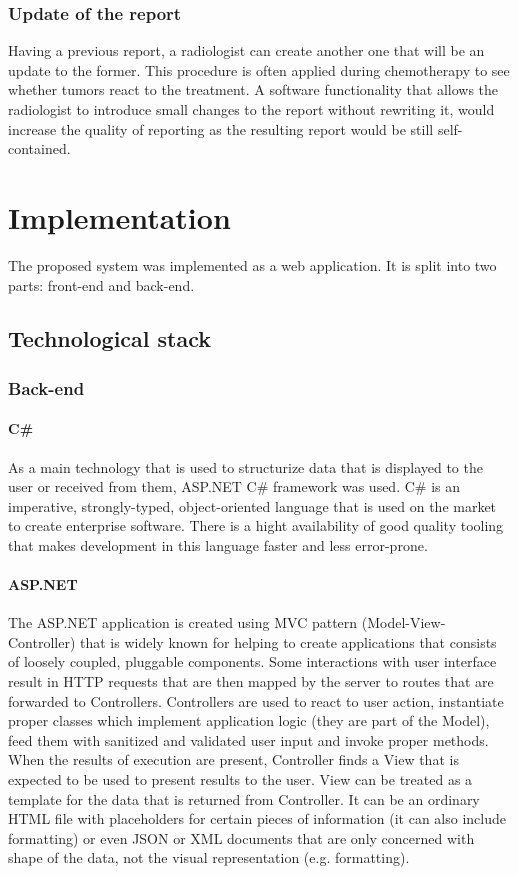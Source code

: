 \documentclass[12pt, twoside, openany]{report}
\theoremstyle{definition}
\begin{document}
\subsection{Update of the report}
Having a previous report, a radiologist can create another one that will be an update to the former. This procedure is often applied during chemotherapy to see whether tumors react to the treatment. A software functionality that allows the radiologist to introduce small changes to the report without rewriting it, would increase the quality of reporting as the resulting report would be still self-contained. 

 



\chapter{Implementation}
The proposed system was implemented as a web application. It is split into two parts: front-end and back-end.  
\section{Technological stack}

\subsection{Back-end}
\subsubsection{C\#}
As a main technology that is used to structurize data that is displayed to the user or received from them, ASP.NET C\# framework was used.
C\# is an imperative, strongly-typed, object-oriented language that is used on the market to create enterprise software. There is a hight availability of good quality tooling that makes development in this language faster and less error-prone.

\subsubsection{ASP.NET}
The ASP.NET application is created using MVC pattern (Model-View-Controller) that is widely known for helping to create applications that consists of loosely coupled, pluggable components. Some interactions with user interface result in HTTP requests that are then mapped by the server to routes that are forwarded to Controllers. Controllers are used to react to user action, instantiate proper classes which implement application logic (they are part of the Model), feed them with sanitized and validated user input and invoke proper methods. When the results of execution are present, Controller finds a View that is expected to be used to present results to the user. View can be treated as a template for the data that is returned from Controller. It can be an ordinary HTML file with placeholders for certain pieces of information (it can also include formatting) or even JSON or XML documents that are only concerned with shape of the data, not the visual representation (e.g. formatting).
\end{document}

